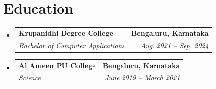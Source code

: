 \documentclass[a4paper,11pt]{article}
\makeatletter
\newcommand{\resumeSubheading}[4]{
	\vspace{-2pt}\item
		\begin{tabular*}{0.97\textwidth}[t]{l@{\extracolsep{\fill}}r}
			\textbf{#1} & \textbf{\small #2} \\
			\textit{\small#3} & \textit{\small #4} \\
		\end{tabular*}\vspace{-7pt}
}
\newcommand{\resumeSubHeadingListStart}{\begin{itemize}[leftmargin=0.15in, label={}]}
\newcommand{\resumeSubHeadingListEnd}{\end{itemize}}
\makeatother
\begin{document}
\section{Education}
\resumeSubHeadingListStart
\resumeSubheading
{Krupanidhi Degree College}{Bengaluru, Karnataka}
{Bachelor of Computer Applications}{Aug. 2021 -- Sep. 2024}
\resumeSubheading
{Al Ameen PU College}{Bengaluru, Karnataka}
{Science}{June 2019 -- March 2021}
\resumeSubHeadingListEnd


\end{document}
